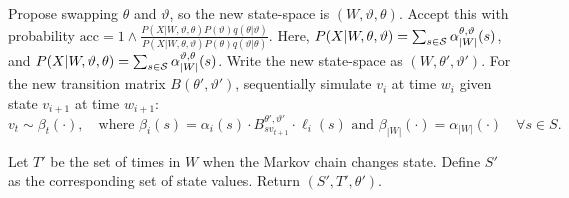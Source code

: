 \begin{algorithm}
\begin{algorithmic}[1]
    Propose swapping $\theta$ and $\vartheta$, so the new state-space is $(W,\vartheta,\theta)$. 
     Accept this with probability 
     $
     \text{acc} 
        =  1 \wedge \frac{P(X| W,\vartheta,\theta)P(\vartheta)q(\theta|\vartheta)}
        {P(X| W,\theta, \vartheta)P(\theta) q(\vartheta|\theta)}.
        $
        Here, $P(X|W,\theta,\vartheta) = \sum_{s \in {\mathcal S}} \alpha^{\theta,\vartheta}_{|W|}(s)$, and $P(X|W,\vartheta,\theta) = \sum_{s \in {\mathcal S}} \alpha^{\vartheta,\theta}_{|W|}(s)$.
    \State Write the new state-space as $(W,\theta',\vartheta')$.
    For the new transition matrix $B(\theta',\vartheta')$,     sequentially simulate $v_i$ at time $w_i$ given state $v_{i+1}$  at time $w_{i+1}$:
    $$ v_t \sim \beta_t(\cdot),\quad \text{where } 
    \beta_i(s) = \alpha_i(s)\cdot B^{\theta',\vartheta'}_{sv_{t+1}} \cdot \ell_i(s) \text{ \ and \ } \beta_{|W|}(\cdot) = \alpha_{|W|}(\cdot) \quad \forall s \in S.$$
    
    \State Let $T'$ be the set of times in $W$ when the Markov chain changes state. Define $S'$ as the corresponding set of state values. Return $(S', T', \theta')$.
\end{algorithmic}
\end{algorithm}

